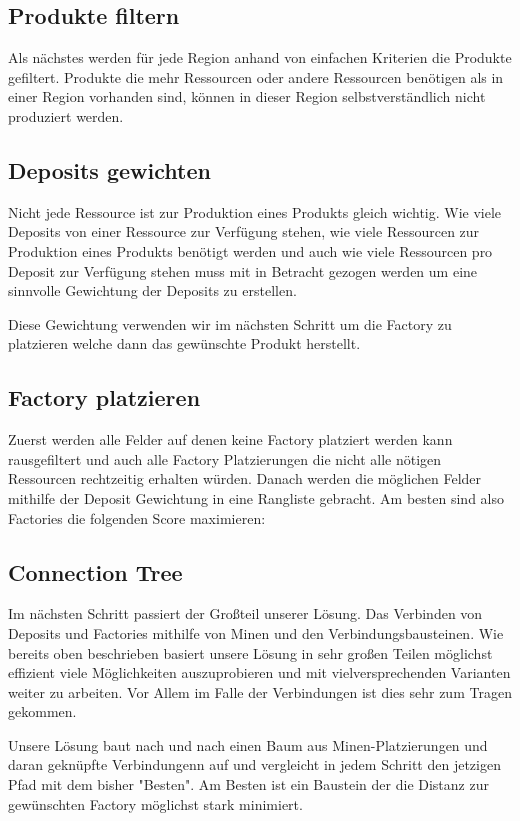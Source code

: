 \documentclass[12pt,a4paper]{article}
\begin{document}
\subsection{Produkte filtern}
Als nächstes werden für jede Region anhand von einfachen Kriterien die Produkte gefiltert. Produkte die mehr Ressourcen oder andere Ressourcen benötigen als in einer Region vorhanden sind, können in dieser Region selbstverständlich nicht produziert werden.

\subsection{Deposits gewichten}
Nicht jede Ressource ist zur Produktion eines Produkts gleich wichtig. Wie viele Deposits  von einer Ressource zur Verfügung stehen, wie viele Ressourcen zur Produktion eines Produkts benötigt werden und auch wie viele Ressourcen pro Deposit zur Verfügung stehen muss mit in Betracht gezogen werden um eine sinnvolle Gewichtung der Deposits zu erstellen.


Diese Gewichtung verwenden wir im nächsten Schritt um die Factory zu platzieren welche dann das gewünschte Produkt herstellt.

\subsection{Factory platzieren}
Zuerst werden alle Felder auf denen keine Factory platziert werden kann rausgefiltert  und auch alle Factory Platzierungen die nicht alle nötigen Ressourcen rechtzeitig erhalten würden. Danach werden die möglichen Felder mithilfe der Deposit Gewichtung in eine Rangliste gebracht. Am besten sind also Factories die folgenden Score maximieren:


\subsection{Connection Tree}
Im nächsten Schritt passiert der Großteil unserer Lösung. Das Verbinden von Deposits und Factories mithilfe von Minen und den Verbindungsbausteinen. Wie bereits oben beschrieben basiert unsere Lösung in sehr großen Teilen möglichst effizient viele Möglichkeiten auszuprobieren und mit vielversprechenden Varianten weiter zu arbeiten. Vor Allem im Falle der Verbindungen ist dies sehr zum Tragen gekommen.

Unsere Lösung baut nach und nach einen Baum aus Minen-Platzierungen und daran geknüpfte Verbindungenn auf und vergleicht in jedem Schritt den jetzigen Pfad mit dem bisher "Besten". Am Besten ist ein Baustein der die Distanz zur gewünschten Factory möglichst stark minimiert. 
\end{document}
